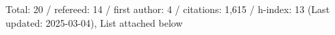Total: 20 / refereed: 14 / first author: 4 / citations: 1,615 / h-index: 13 (Last updated: 2025-03-04), List attached below